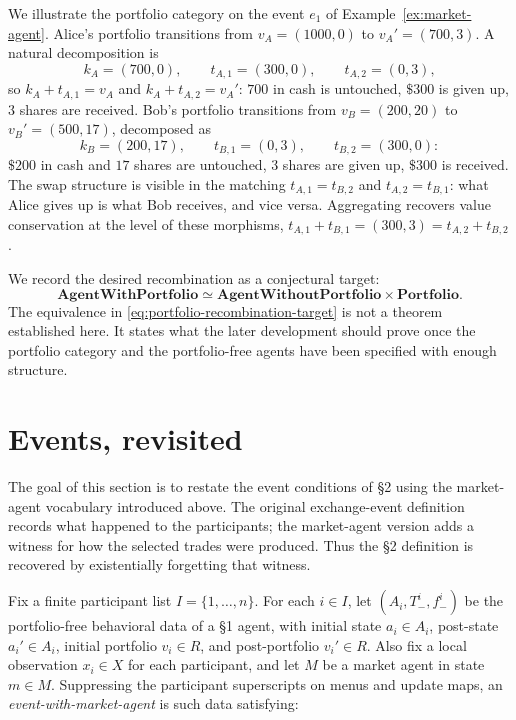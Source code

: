 \documentclass[11pt, one side, article]{memoir}
\theoremstyle{definition}
\theoremstyle{plain}
\newenvironment{example}
  {\pushQED{\qed}\renewcommand{\qedsymbol}{$\lozenge$}\examplex}
  {\popQED\endexamplex}
\newcommand{\Cat}[1]{\mathbf{#1}}%
\newcommand{\0}{\textsf{0}}
\newcommand{\1}{\tn{\textsf{1}}}
\begin{document}
\begin{example}\label{ex:portfolio-morphisms}
We illustrate the portfolio category on the event $e_1$ of Example~\ref{ex:market-agent}.  Alice's portfolio transitions from $v_A = (1000, 0)$ to $v_A' = (700, 3)$.  A natural decomposition is
\[
k_A = (700, 0),\qquad t_{A,1} = (300, 0),\qquad t_{A,2} = (0, 3),
\]
so $k_A + t_{A,1} = v_A$ and $k_A + t_{A,2} = v_A'$: $700$ in cash is untouched, $\$300$ is given up, $3$ shares are received.  Bob's portfolio transitions from $v_B = (200, 20)$ to $v_B' = (500, 17)$, decomposed as
\[
k_B = (200, 17),\qquad t_{B,1} = (0, 3),\qquad t_{B,2} = (300, 0):
\]
$\$200$ in cash and $17$ shares are untouched, $3$ shares are given up, $\$300$ is received.  The swap structure is visible in the matching $t_{A,1} = t_{B,2}$ and $t_{A,2} = t_{B,1}$: what Alice gives up is what Bob receives, and vice versa.  Aggregating recovers value conservation at the level of these morphisms, $t_{A,1} + t_{B,1} = (300, 3) = t_{A,2} + t_{B,2}$.
\end{example}

We record the desired recombination as a conjectural target:
\begin{equation}\label{eq:portfolio-recombination-target}
\Cat{AgentWithPortfolio}
\simeq
\Cat{AgentWithoutPortfolio}\times\Cat{Portfolio}.
\end{equation}
The equivalence in \eqref{eq:portfolio-recombination-target} is not a theorem established here.  It states what the later development should prove once the portfolio category and the portfolio-free agents have been specified with enough structure.

\section*{Events, revisited}
\label{sec:events-revisited}

The goal of this section is to restate the event conditions of \S2 using the market-agent vocabulary introduced above.  The original exchange-event definition records what happened to the participants; the market-agent version adds a witness for how the selected trades were produced.  Thus the \S2 definition is recovered by existentially forgetting that witness.

Fix a finite participant list $I=\{1,\ldots,n\}$.  For each $i\in I$, let $(A_i,T^i_{-},f^i_{-})$ be the portfolio-free behavioral data of a \S1 agent, with initial state $a_i\in A_i$, post-state $a_i'\in A_i$, initial portfolio $v_i\in R$, and post-portfolio $v_i'\in R$.  Also fix a local observation $x_i\in X$ for each participant, and let $M$ be a market agent in state $m\in M$.  Suppressing the participant superscripts on menus and update maps, an \emph{event-with-market-agent} is such data satisfying:
\end{document}
